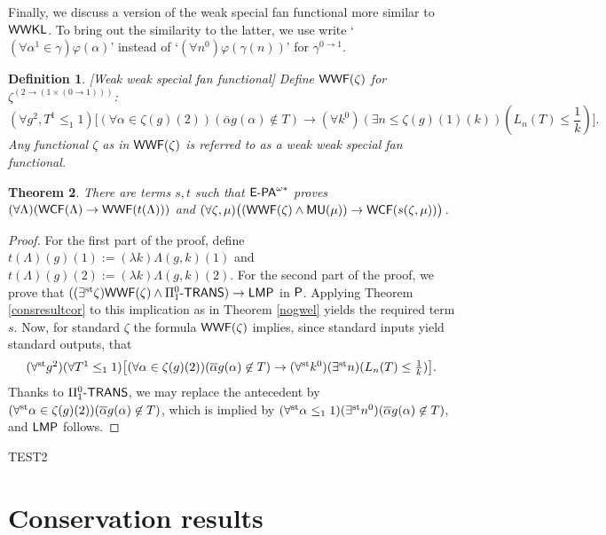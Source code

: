 \documentclass[reqno]{amsart}
\newtheorem{thm}{Theorem}
\newtheorem{defi}[thm]{Definition}
\def\bdefi{\begin{defi}\rm}
\def\edefi{\end{defi}}
\def\MU{\textup{\textsf{MU}}}
\def\WWKL{\textup{\textsf{WWKL}}}
\def\P{\textup{\textsf{P}}}
\def\st{\textup{st}}
\def\di{\rightarrow}
\def\paai{\Pi_{1}^{0}\textup{-\textsf{TRANS}}}
\def\WWF{\textup{\textsf{WWF}}}
\def\LMP{\textup{\textsf{LMP}}}
\def\WCF{\textup{\textsf{WCF}}}
\numberwithin{equation}{section}
\numberwithin{thm}{section}
\begin{document}
Finally, we discuss a version of the weak special fan functional more similar to $\WWKL$.  To bring out the similarity to the latter, we use write `$(\forall \alpha^{1} \in \gamma)\varphi(\alpha)$' instead of `$(\forall n^{0})\varphi(\gamma(n))$' for $\gamma^{0\di 1}$. 
\bdefi[Weak weak special fan functional] 
Define $\WWF(\zeta)$ for $\zeta^{(2\di (1\times (0\di 1)))}$:
\[\textstyle
(\forall g^{2}, T^{1}\leq_{1}1)\big[(\forall \alpha \in \zeta(g)(2))  (\overline{\alpha}g(\alpha)\not\in T)
\di   (\forall k^{0})(\exists n\leq\zeta(g)(1)(k) ) (L_{n}(T)\leq\frac{1}{k})\big].
\]
Any functional $\zeta$ as in $\WWF(\zeta)$ is referred to as a \emph{weak weak special fan functional}.
\edefi
\begin{thm}
There are terms $s, t$ such that $\textsf{\textup{E-PA}}^{\omega*}$ proves $(\forall \Lambda)(\WCF(\Lambda)\di \WWF(t(\Lambda)))$ 
and $(\forall \zeta, \mu)\big((\WWF(\zeta)\wedge \MU(\mu))\di \WCF(s(\zeta,\mu))\big)$. 
\end{thm}
\begin{proof}
For the first part of the proof, define $t(\Lambda)(g)(1):=(\lambda k)\Lambda(g,k)(1)$ and $t(\Lambda)(g)(2):= (\lambda k)\Lambda(g,k)(2)$.  For the second part of the proof, we prove that 
$((\exists^{\st} \zeta)\WWF(\zeta)\wedge \paai)\di \LMP$ in $\P$.  Applying Theorem \ref{consresultcor} to this implication as in Theorem \ref{nogwel} yields the required term $s$.  
Now, for standard $\zeta$ the formula $\WWF(\zeta)$ implies, since standard inputs yield standard outputs, that
\[\textstyle
(\forall^{\st} g^{2})(\forall T^{1}\leq_{1}1)\big[(\forall \alpha \in \zeta(g)(2))  (\overline{\alpha}g(\alpha)\not\in T)
\di   (\forall^{\st} k^{0})(\exists^{\st} n ) (L_{n}(T)\leq\frac{1}{k})\big].
\]
Thanks to $\paai$, we may replace the antecedent by $(\forall^{\st} \alpha \in \zeta(g)(2))  (\overline{\alpha}g(\alpha)\not\in T)$, 
which is implied by $(\forall^{\st}\alpha\leq_{1}1)(\exists^{\st}n^{0})(\overline{\alpha}g(\alpha)\not\in T)$, and $\LMP$ follows.   
\end{proof}

TEST2

\appendix

\section{Conservation results}\label{conssec}
\end{document}
